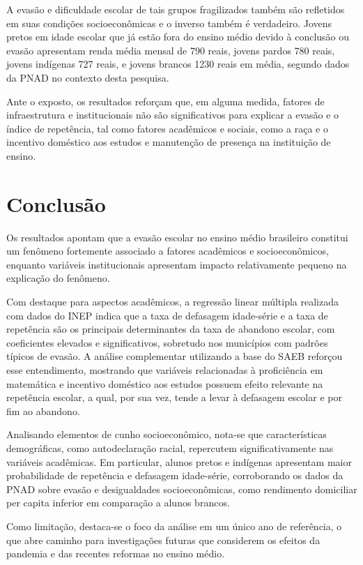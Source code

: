 \documentclass[english, spanish, brazilian]{RBIEarticle} %
\begin{document}
A evasão e dificuldade escolar de tais grupos fragilizados também são refletidos em suas condições socioeconômicas e o inverso também é verdadeiro. Jovens pretos em idade escolar que já estão fora do ensino médio devido à conclusão ou evasão apresentam renda média mensal de 790 reais, jovens pardos 780 reais, jovens indígenas 727 reais, e jovens brancos 1230 reais em média, segundo dados da PNAD no contexto desta pesquisa.

Ante o exposto, os resultados reforçam que, em alguma medida, fatores de infraestrutura e institucionais não são significativos para explicar a evasão e o índice de repetência, tal como fatores acadêmicos e sociais, como a raça e o incentivo doméstico aos estudos e manutenção de presença na instituição de ensino.


\pagebreak
\section{Conclusão}
Os resultados apontam que a evasão escolar no ensino médio brasileiro constitui um fenômeno fortemente associado a fatores acadêmicos e socioeconômicos, enquanto variáveis institucionais apresentam impacto relativamente pequeno na explicação do fenômeno. 

Com destaque para aspectos acadêmicos, a regressão linear múltipla realizada com dados do INEP indica que a taxa de defasagem idade-série e a taxa de repetência são os principais determinantes da taxa de abandono escolar, com coeficientes elevados e significativos, sobretudo nos municípios com padrões típicos de evasão. A análise complementar utilizando a base do SAEB reforçou esse entendimento, mostrando que variáveis relacionadas à proficiência em matemática e incentivo doméstico aos estudos possuem efeito relevante na repetência escolar, a qual, por sua vez, tende a levar à defasagem escolar e por fim ao abandono. 

Analisando elementos de cunho socioeconômico, nota-se que características demográficas, como autodeclaração racial, repercutem significativamente nas variáveis acadêmicas. Em particular, alunos pretos e indígenas apresentam maior probabilidade de repetência e defasagem idade-série, corroborando os dados da PNAD sobre evasão e desigualdades socioeconômicas, como rendimento domiciliar per capita inferior em comparação a alunos brancos.

Como limitação, destaca-se o foco da análise em um único ano de referência, o que abre caminho para investigações futuras que considerem os efeitos da pandemia e das recentes reformas no ensino médio.
\end{document}
